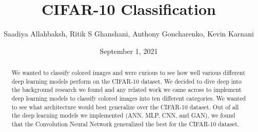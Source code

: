 \documentclass[12pt,letter]{article}
\begin{document}
\title{CIFAR-10 Classification} %
\author{Saadiya Allahbaksh, Ritik S Ghanshani, Anthony Goncharenko, Kevin Karnani}
\date{September 1, 2021} %
\maketitle %

\begin{abstract}
\normalsize
\noindent We wanted to classify colored images and were curious to see how well various different deep learning models perform on the CIFAR-10 dataset. We decided to dive deep into the background research we found and any related work we came across to implement deep learning models to classify colored images into ten different categories. We wanted to see what architecture would best generalize over the CIFAR-10 dataset. Out of all the deep learning models we implemented (ANN, MLP, CNN, and GAN), we found that the Convolution Neural Network generalized the best for the CIFAR-10 dataset.
\end{abstract}

\setcounter{tocdepth}{5}
\setcounter{secnumdepth}{5}
\newpage
\tableofcontents

\clearpage







\clearpage

{}

\end{document}
